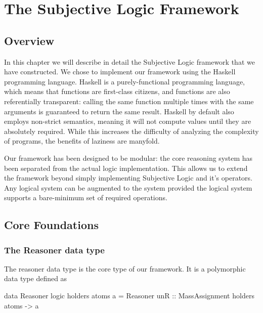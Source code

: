 \documentclass[a4paper]{report}
\begin{document}


\chapter{The Subjective Logic Framework}
\label{chap:sl-framework}

\section{Overview}

\par
In this chapter we will describe in detail the Subjective Logic framework
that we have constructed. We chose to implement our framework using the Haskell
programming language. Haskell is a purely-functional programming language, which
means that functions are first-class citizens, and functions are also referentially
transparent: calling the same function multiple times with the same arguments
is guaranteed to return the same result. Haskell by default also employs non-strict
semantics, meaning it will not compute values until they are absolutely required.
While this increases the difficulty of analyzing the complexity of programs, the
benefits of laziness are manyfold.

\par
Our framework has been designed to be modular: the core reasoning system has been
separated from the actual logic implementation. This allows us to extend the framework
beyond simply implementing Subjective Logic and it's operators. Any logical system
can be augmented to the system provided the logical system supports a bare-minimum
set of required operations.



\section{Core Foundations}

\subsection{The Reasoner data type}

\par
The reasoner data type is the core type of our framework. It is a polymorphic data
type defined as

\begin{code}
  data Reasoner logic holders atoms a = Reasoner {
    unR :: MassAssignment holders atoms -> a
  }
\end{code}
\end{document}
